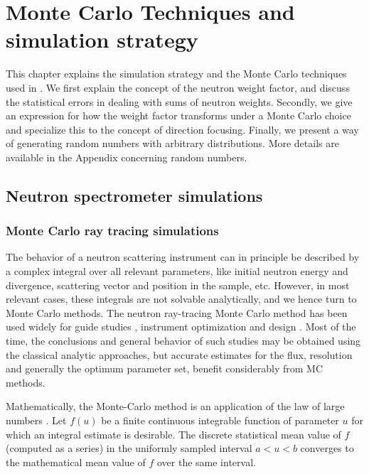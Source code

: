 \chapter{Monte Carlo Techniques and simulation strategy}
\label{s:MCtechniques}

\newcommand{\Ombold}{\mbox{\boldmath $\Omega$}}

This chapter explains the simulation strategy and the Monte Carlo
techniques used in \MCS. We first explain the concept of the neutron
weight factor, and discuss the statistical errors in dealing with sums
of neutron weights.  Secondly, we give an expression for how the weight
factor transforms under a Monte Carlo choice and specialize this
to the concept of direction focusing.  Finally, we present a way of
generating random numbers with arbitrary distributions.
More details are available in the Appendix concerning random numbers.


\section{Neutron spectrometer simulations}

\subsection{Monte Carlo ray tracing simulations}
The behavior of a neutron scattering instrument can in principle be described by a complex integral over all relevant parameters, like initial neutron energy and divergence, scattering vector and position in the sample, etc. However, in most relevant cases, these integrals are not solvable analytically, and we hence turn to Monte Carlo methods. The neutron ray-tracing Monte Carlo method has been used widely for guide studies \cite{Copley93,Farhi02,Schanzer04}, instrument optimization and design \cite{Zsigmond04,Lieutenant05}. Most of the time, the conclusions and general behavior of such studies may be obtained using the classical analytic approaches, but accurate estimates for the flux, resolution and generally the optimum parameter set, benefit considerably from MC methods.

Mathematically, the Monte-Carlo method is an application of the law of large numbers \cite{James80,Grimmett92}. Let $f(u)$ be a finite continuous integrable function of parameter $u$ for which an integral estimate is desirable. The discrete statistical mean value of $f$ (computed as a series) in the uniformly sampled interval $a < u < b$ converges to the mathematical mean value of $f$ over the same interval.

